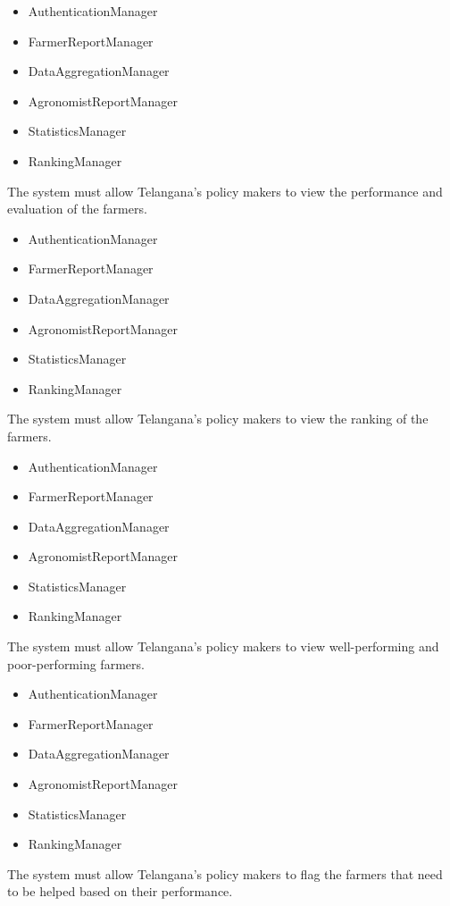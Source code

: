 \begin{itemize}
\begin{itemize}
\item AuthenticationManager
\item FarmerReportManager
\item DataAggregationManager
\item AgronomistReportManager
\item StatisticsManager
\item RankingManager

\end{itemize}
 The system must allow Telangana’s policy makers to view the performance and evaluation of the farmers.
\begin{itemize}

\item AuthenticationManager
\item FarmerReportManager
\item DataAggregationManager
\item AgronomistReportManager
\item StatisticsManager
\item RankingManager


\end{itemize}
 The system must allow Telangana’s policy makers to view the ranking of the farmers.
\begin{itemize}

\item AuthenticationManager
\item FarmerReportManager
\item DataAggregationManager
\item AgronomistReportManager
\item StatisticsManager
\item RankingManager

\end{itemize}
 The system must allow Telangana’s policy makers to view well-performing and poor-performing farmers.
\begin{itemize}

\item AuthenticationManager
\item FarmerReportManager
\item DataAggregationManager
\item AgronomistReportManager
\item StatisticsManager
\item RankingManager

\end{itemize}
 The system must allow Telangana’s policy makers to flag the farmers that need to be helped based on their performance.
\begin{itemize}


\end{itemize}
\end{itemize}
